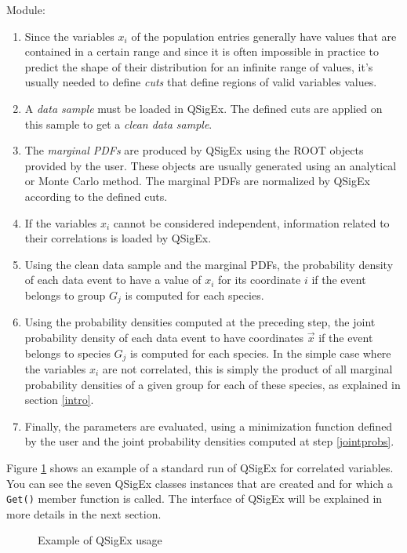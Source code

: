Module:
\begin{enumerate}

\item\label{gs:mm:cuts} Since the variables $x_i$ of the population entries generally have values that are contained in a certain range and since it is often impossible in practice to predict the shape of their distribution for an infinite range of values, it's usually needed to define {\em cuts} that define regions of valid variables values.

\item\label{gs:mm:cdata} A {\em data sample} must be loaded in QSigEx.
The defined cuts are applied on this sample to get a {\em clean data sample}.

\item\label{gs:mm:pdfs} The {\em marginal PDFs} are produced by QSigEx using the ROOT objects provided by the user.
These objects are usually generated using an analytical or Monte Carlo method.
The marginal PDFs are normalized by QSigEx according to the defined cuts.

\item\label{gs:mm:cor} If the variables $x_i$ cannot be considered independent, information related to their correlations is loaded by QSigEx.

\item\label{gs:mm:mpd} Using the clean data sample and the marginal PDFs, the probability density of each data event to have a value of $x_i$ for its coordinate $i$ if the event belongs to group $G_j$ is computed for each species.

\item\label{gs:mm:jpd} Using the probability densities computed at the preceding step, the joint probability density of each data event to have coordinates $\vec{x}$ if the event belongs to species $G_j$ is computed for each species.
In the simple case where the variables $x_i$ are not correlated, this is simply the product of all marginal probability densities of a given group for each of these species, as explained in section \ref{intro}. \label{jointprobs} 

\item\label{gs:mm:fit} Finally, the parameters are evaluated, using a minimization function defined by the user and the joint probability densities computed at step \ref{jointprobs}.
\end{enumerate}

Figure \ref{gs:ex} shows an example of a standard run of QSigEx for correlated variables.
You can see the seven QSigEx classes instances that are created and for which a \texttt{Get()} member function is called.
The interface of QSigEx will be explained in more details in the next section.

\begin{figure}
\centering

\caption{Example of QSigEx usage}
\label{gs:ex}
\end{figure}

 

